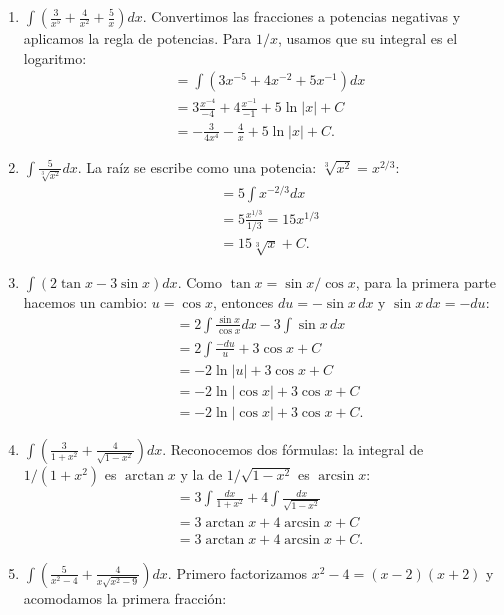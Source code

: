 \documentclass[12pt, letterpaper]{article}
\makeatletter
\renewcommand{\alph}[1]{\expandafter\@alphlatin\csname c@#1\endcsname}
\newcommand{\@alphlatin}[1]{\ifcase#1\or a\or b\or c\or d\or e\or f\or g\or h\or i\or j\or k\or l\or m\or n\or o\or p\or q\or r\or s\or t\or u\or v\or w\or x\or y\or z\else\@ctrerr\fi}
\makeatother
\begin{document}
\begin{enumerate}[label=\alph*)]
\[\begin{aligned}
  &=3\frac{x^{3/2}}{3/2}-5\frac{x^{6/5}}{6/5}\\
  &=2x^{3/2}-\frac{25}{6}x^{6/5}+C\\
  &=\boxed{2x^{3/2}-\frac{25}{6}x^{6/5}+C}.
  \end{aligned}
  \]
  \item $\displaystyle\int\left(\frac3{x^5}+\frac4{x^2}+\frac5x\right)dx$. Convertimos las fracciones a potencias negativas y aplicamos la regla de potencias. Para $1/x$, usamos que su integral es el logaritmo:
  \[
  \begin{aligned}
  &=\int(3x^{-5}+4x^{-2}+5x^{-1})dx\\
  &=3\frac{x^{-4}}{-4}+4\frac{x^{-1}}{-1}+5\ln|x|+C\\
  &=\boxed{-\frac{3}{4x^4}-\frac4x+5\ln|x|+C}.
  \end{aligned}
  \]
  \item $\displaystyle\int\frac5{\sqrt[3]{x^2}}dx$. La raíz se escribe como una potencia: $\sqrt[3]{x^2}=x^{2/3}$:
  \[
  \begin{aligned}
  &=5\int x^{-2/3}dx\\
  &=5\frac{x^{1/3}}{1/3}=15x^{1/3}\\
  &=\boxed{15\sqrt[3]{x}+C}.
  \end{aligned}
  \]
  \item $\displaystyle\int(2\tan x-3\sin x)dx$. Como $\tan x=\sin x/\cos x$, para la primera parte hacemos un cambio: $u=\cos x$, entonces $du=-\sin x\,dx$ y $\sin x\,dx=-du$:
  \[
  \begin{aligned}
  &=2\int\frac{\sin x}{\cos x}dx-3\int\sin x\,dx\\
  &=2\int\frac{-du}{u}+3\cos x+C\\
  &=-2\ln|u|+3\cos x+C\\
  &=-2\ln|\cos x|+3\cos x+C\\
  &=\boxed{-2\ln|\cos x|+3\cos x+C}.
  \end{aligned}
  \]
  \item $\displaystyle\int\left(\frac3{1+x^2}+\frac4{\sqrt{1-x^2}}\right)dx$. Reconocemos dos fórmulas: la integral de $1/(1+x^2)$ es $\arctan x$ y la de $1/\sqrt{1-x^2}$ es $\arcsin x$:
  \[
  \begin{aligned}
  &=3\int\frac{dx}{1+x^2}+4\int\frac{dx}{\sqrt{1-x^2}}\\
  &=3\arctan x+4\arcsin x+C\\
  &=\boxed{3\arctan x+4\arcsin x+C}.
  \end{aligned}
  \]
  \item $\displaystyle\int\left(\frac5{x^2-4}+\frac4{x\sqrt{x^2-9}}\right)dx$. Primero factorizamos $x^2-4=(x-2)(x+2)$ y acomodamos la primera fracción:

\end{enumerate}
\end{document}
